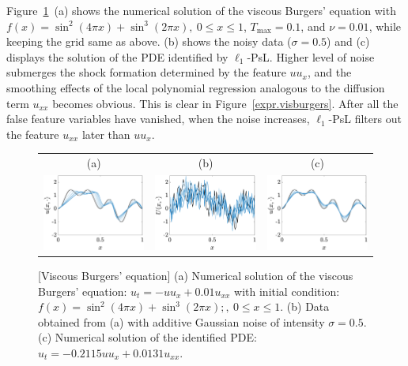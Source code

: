 \documentclass[a4paper,11pt]{article}
\begin{document}
Figure~\ref{fig.visburgers}~(a) shows the numerical solution of the viscous Burgers' equation with $f(x)=\sin^2(4\pi x)+\sin^3(2\pi x),~0\leq x\leq 1$, $T_{\max}=0.1$, and $\nu=0.01$, while keeping the grid same as above. (b) shows the noisy data ($\sigma=0.5$) and (c) displays the  solution of the PDE identified by $\ell_1$-PsL. Higher level of noise submerges the shock formation determined by the feature $uu_x$, and the smoothing effects of the local polynomial regression analogous to the diffusion term $u_{xx}$ becomes obvious. This is clear in Figure~\ref{expr.visburgers}. After all the false feature variables have vanished, when the noise increases, $\ell_1$-PsL filters out the feature $u_{xx}$ later than $uu_x$.
\begin{figure}
\centering
\begin{tabular}{ccc}
(a)&(b)&(c)\\
\includegraphics[width=2in]{Figures/visburgers_sol.eps}&
\includegraphics[width=2in]{Figures/visburgers_noise.eps}&
\includegraphics[width=2in]{Figures/visburgers_resimul.eps}
\end{tabular}
\caption{[Viscous Burgers' equation] (a) Numerical solution of the viscous Burgers' equation: $u_t=-uu_{x}+0.01u_{xx}$ with initial condition: $f(x)=\sin^2(4\pi x)+\sin^3(2\pi x);,~0\leq x\leq 1$. (b) Data obtained from (a) with additive Gaussian noise of intensity $\sigma=0.5$. (c) Numerical solution of the identified PDE: $u_t=-0.2115uu_{x}+0.0131u_{xx}$. }	\label{fig.visburgers}
\end{figure}
\end{document}
